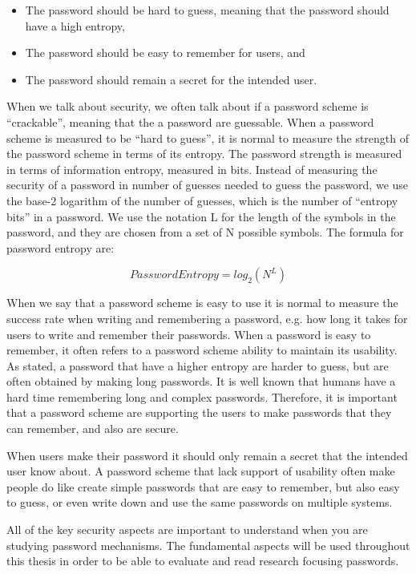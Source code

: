     \begin{itemize}
      \item The password should be hard to guess, meaning that the password should have a high entropy,
      \item The password should be easy to remember for users, and 
      \item The password should remain a secret for the intended user.
    \end{itemize}

  When we talk about security, we often talk about if a password scheme is ``crackable'', meaning that the a password are guessable. When a password scheme is measured to be ``hard to guess'', it is normal to measure the strength of the password scheme in terms of its entropy. The password strength is measured in terms of information entropy, measured in bits. Instead of measuring the security of a password in number of guesses needed to guess the password, we use the base-2 logarithm of the number of guesses, which is the number of ``entropy bits'' in a password. We use the notation L for the length of the symbols in the password, and they are chosen from a set of N possible symbols. The formula for password entropy are:

    \begin{equation}
      Password Entropy = log_{2}(N^{L})
    \end{equation}

  When we say that a password scheme is easy to use it is normal to measure the success rate when writing and remembering a password, e.g. how long it takes for users to write and remember their passwords. When a password is easy to remember, it often refers to a password scheme ability to maintain its usability. As stated, a password that have a higher entropy are harder to guess, but are often obtained by making long passwords. It is well known that humans have a hard time remembering long and complex passwords. Therefore, it is important that a password scheme are supporting the users to make passwords that they can remember, and also are secure.

  When users make their password it should only remain a secret that the intended user know about. A password scheme that lack support of usability often make people do like create simple passwords that are easy to remember, but also easy to guess, or even write down and use the same passwords on multiple systems.

  All of the key security aspects are important to understand when you are studying password mechanisms. The fundamental aspects will be used throughout this thesis in order to be able to evaluate and read research focusing passwords. 

